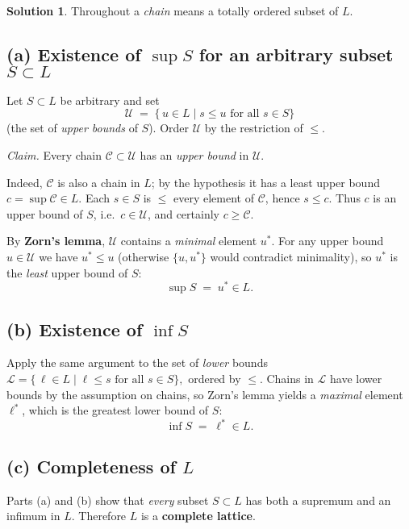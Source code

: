 \documentclass[12pt]{article}
\theoremstyle{definition} %
\newtheorem{solution}{Solution}
\theoremstyle{plain} %
\begin{document}
  \begin{solution}
  Throughout a \emph{chain} means a totally ordered subset of \(L\).
  
  \subsection*{(a)  Existence of \(\sup S\) for an arbitrary subset
                \(S\subset L\)}
  
  Let \(S\subset L\) be arbitrary and set
  \[
     \mathcal U
        \;=\;
     \{\,u\in L \mid s\le u\text{ for all }s\in S\}
  \]
  (the set of \emph{upper bounds} of \(S\)).
  Order \(\mathcal U\) by the restriction of \(\le\).
  
  \smallskip
  \textit{Claim.}  Every chain \(\mathcal C\subset\mathcal U\) has an
  \emph{upper bound} in \(\mathcal U\).
  
  Indeed, \(\mathcal C\) is also a chain in \(L\); by the hypothesis it
  has a least upper bound \(c=\sup \mathcal C\in L\).
  Each \(s\in S\) is \(\le\) every element of \(\mathcal C\), hence
  \(s\le c\).
  Thus \(c\) is an upper bound of \(S\), i.e.\ \(c\in\mathcal U\), and
  certainly \(c\ge\mathcal C\).
  
  \smallskip
  By \textbf{Zorn’s lemma}, \(\mathcal U\) contains a
  \emph{minimal} element \(u^{\ast}\).
  For any upper bound \(u\in\mathcal U\) we have \(u^{\ast}\le u\)
  (otherwise \(\{u,u^{\ast}\}\) would contradict minimality), so
  \(u^{\ast}\) is the \emph{least} upper bound of \(S\):
  \[
     \boxed{\;
        \sup S \;=\; u^{\ast}\in L.
     \;}
  \]
  
  \subsection*{(b)  Existence of \(\inf S\)}
  
  Apply the same argument to the set of \emph{lower} bounds
  \(
     \mathcal L=\{\,\ell\in L \mid \ell\le s\text{ for all }s\in S\},
  \)
  ordered by \(\le\).
  Chains in \(\mathcal L\) have lower bounds by the
  assumption on chains, so Zorn’s lemma yields a
  \emph{maximal} element \(\ell^{\ast}\), which is the greatest lower
  bound of \(S\):
  \[
     \boxed{\;
        \inf S \;=\; \ell^{\ast}\in L.
     \;}
  \]
  
  \subsection*{(c)  Completeness of \(L\)}
  
  Parts (a) and (b) show that \emph{every} subset \(S\subset L\) has both
  a supremum and an infimum in \(L\).  
  Therefore \(L\) is a \textbf{complete lattice}.
  \end{solution}
\end{document}
